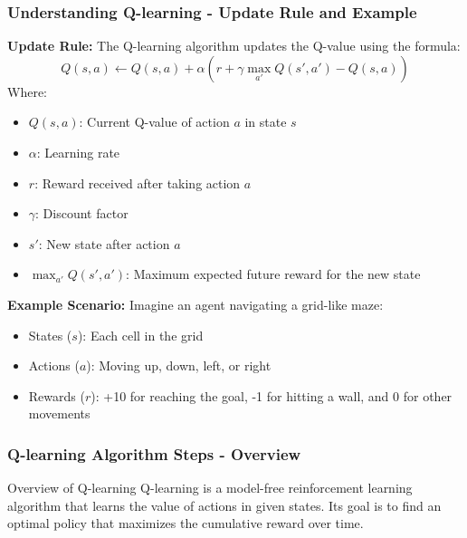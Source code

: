 \documentclass{beamer}
\begin{document}
\begin{frame}[fragile]
    \frametitle{Understanding Q-learning - Update Rule and Example}
    \textbf{Update Rule:}
    The Q-learning algorithm updates the Q-value using the formula:
    \begin{equation}
        Q(s, a) \leftarrow Q(s, a) + \alpha \left( r + \gamma \max_{a'} Q(s', a') - Q(s, a) \right)
    \end{equation}
    Where:
    \begin{itemize}
        \item $Q(s, a)$: Current Q-value of action $a$ in state $s$
        \item $\alpha$: Learning rate
        \item $r$: Reward received after taking action $a$
        \item $\gamma$: Discount factor
        \item $s'$: New state after action $a$
        \item $\max_{a'} Q(s', a')$: Maximum expected future reward for the new state
    \end{itemize}

    \textbf{Example Scenario:}
    Imagine an agent navigating a grid-like maze:
    \begin{itemize}
        \item States ($s$): Each cell in the grid
        \item Actions ($a$): Moving up, down, left, or right
        \item Rewards ($r$): +10 for reaching the goal, -1 for hitting a wall, and 0 for other movements
    \end{itemize}
\end{frame}

\begin{frame}[fragile]
    \frametitle{Q-learning Algorithm Steps - Overview}
    \begin{block}{Overview of Q-learning}
        Q-learning is a model-free reinforcement learning algorithm that learns the value of actions in given states. Its goal is to find an optimal policy that maximizes the cumulative reward over time.
    \end{block}
\end{frame}
\end{document}
